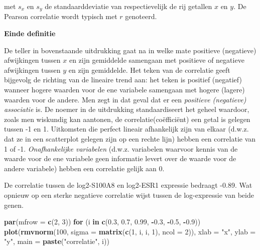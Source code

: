 \documentclass[12pt,dutch,coursenotes]{book}
\newenvironment{Shaded}{\begin{snugshade}}{\end{snugshade}}
\newcommand{\KeywordTok}[1]{\textcolor[rgb]{0.13,0.29,0.53}{\textbf{#1}}}
\newcommand{\DataTypeTok}[1]{\textcolor[rgb]{0.13,0.29,0.53}{#1}}
\newcommand{\DecValTok}[1]{\textcolor[rgb]{0.00,0.00,0.81}{#1}}
\newcommand{\FloatTok}[1]{\textcolor[rgb]{0.00,0.00,0.81}{#1}}
\newcommand{\StringTok}[1]{\textcolor[rgb]{0.31,0.60,0.02}{#1}}
\newcommand{\ControlFlowTok}[1]{\textcolor[rgb]{0.13,0.29,0.53}{\textbf{#1}}}
\newcommand{\OperatorTok}[1]{\textcolor[rgb]{0.81,0.36,0.00}{\textbf{#1}}}
\newcommand{\NormalTok}[1]{#1}
\theoremstyle{definition}
\theoremstyle{definition}
\theoremstyle{definition}
\theoremstyle{remark}
\begin{document}
met \(s_{x}\) en \(s_{y}\) de standaarddeviatie van respectievelijk de
rij getallen \(x\) en \(y\). De Pearson correlatie wordt typisch met
\(r\) genoteerd.

\textbf{Einde definitie}

De teller in bovenstaande uitdrukking gaat na in welke mate positieve
(negatieve) afwijkingen tussen \(x\) en zijn gemiddelde samengaan met
positieve of negatieve afwijkingen tussen \(y\) en zijn gemiddelde. Het
teken van de correlatie geeft bijgevolg de richting van de lineaire
trend aan: het teken is positief (negatief) wanneer hogere waarden voor
de ene variabele samengaan met hogere (lagere) waarden voor de andere.
Men zegt in dat geval dat er een \emph{positieve (negatieve) associatie}
is. De noemer in de uitdrukking standaardiseert het geheel waardoor,
zoals men wiskundig kan aantonen, de correlatie(coëfficiënt) een getal
is gelegen tussen -1 en 1. Uitkomsten die perfect lineair afhankelijk
zijn van elkaar (d.w.z. dat ze in een scatterplot gelegen zijn op een
rechte lijn) hebben een correlatie van 1 of -1. \emph{Onafhankelijke
variabelen} (d.w.z. variabelen waarvoor kennis van de waarde voor de ene
variabele geen informatie levert over de waarde voor de andere
variabele) hebben een correlatie gelijk aan 0.

De correlatie tussen de log2-S100A8 en log2-ESR1 expressie bedraagt
-0.89. Wat opnieuw op een sterke negatieve correlatie wijst tussen de
log-expressie van beide genen.

\begin{Shaded}
\begin{Highlighting}[]
\KeywordTok{par}\NormalTok{(}\DataTypeTok{mfrow =} \KeywordTok{c}\NormalTok{(}\DecValTok{2}\NormalTok{, }\DecValTok{3}\NormalTok{))}
\ControlFlowTok{for}\NormalTok{ (i }\ControlFlowTok{in} \KeywordTok{c}\NormalTok{(}\FloatTok{0.3}\NormalTok{, }\FloatTok{0.7}\NormalTok{, }\FloatTok{0.99}\NormalTok{, }\OperatorTok{-}\FloatTok{0.3}\NormalTok{, }\OperatorTok{-}\FloatTok{0.5}\NormalTok{, }\OperatorTok{-}\FloatTok{0.9}\NormalTok{)) }\KeywordTok{plot}\NormalTok{(}\KeywordTok{rmvnorm}\NormalTok{(}\DecValTok{100}\NormalTok{, }
    \DataTypeTok{sigma =} \KeywordTok{matrix}\NormalTok{(}\KeywordTok{c}\NormalTok{(}\DecValTok{1}\NormalTok{, i, i, }\DecValTok{1}\NormalTok{), }\DataTypeTok{ncol =} \DecValTok{2}\NormalTok{)), }\DataTypeTok{xlab =} \StringTok{"x"}\NormalTok{, }
    \DataTypeTok{ylab =} \StringTok{"y"}\NormalTok{, }\DataTypeTok{main =} \KeywordTok{paste}\NormalTok{(}\StringTok{"correlatie"}\NormalTok{, i))}
\end{Highlighting}
\end{Shaded}
\end{document}
